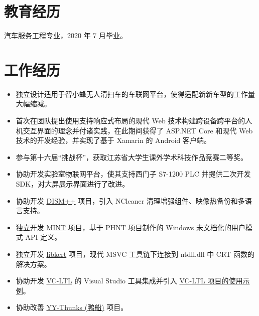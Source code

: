 \documentclass{resume}
\begin{document}
\renewcommand\headrulewidth{0pt}



\section{教育经历}

  汽车服务工程专业，2020 年 7 月毕业。

\section{工作经历}
  
\begin{itemize}
  \item 独立设计适用于智小蜂无人清扫车的车联网平台，使得适配新新车型的工作量大幅缩减。
  \item 首次在团队提出使用支持响应式布局的现代 Web 技术构建跨设备跨平台的人机交互界面的理念并付诸实践，在此期间获得了 ASP.NET Core 和现代 Web 技术的开发经验，并实现了基于 Xamarin 的 Android 客户端。
  \item 参与第十六届“挑战杯”，获取江苏省大学生课外学术科技作品竞赛二等奖。
  \item 协助开发实验室物联网平台，使其支持西门子 S7-1200 PLC 并提供二次开发 SDK，对大屏展示界面进行了改进。
\end{itemize}

\datedsubsection{\textbf{初雨团队}}{2014.07 -- 现在}
\begin{itemize}
  \item 协助开发 \href{http://www.chuyu.me/zh-Hans/index.html}{DISM++} 项目，引入 NCleaner 清理增强组件、映像热备份和多语言支持。
  \item 独立开发 \href{https://github.com/Chuyu-Team/MINT}{MINT} 项目，基于 PHNT 项目制作的 Windows 未文档化的用户模式 API 定义。
  \item 独立开发 \href{https://github.com/Chuyu-Team/libkcrt}{libkcrt} 项目，现代 MSVC 工具链下连接到 ntdll.dll 中 CRT 函数的解决方案。
  \item 协助开发 \href{https://github.com/Chuyu-Team/VC-LTL}{VC-LTL} 的 Visual Studio 工具集成并引入 \href{https://github.com/Chuyu-Team/vc-ltl-samples}{VC-LTL 项目的使用示例}。
  \item 协助改善 \href{https://github.com/Chuyu-Team/YY-Thunks}{YY-Thunks (鸭船)} 项目。
\end{itemize}
\end{document}
